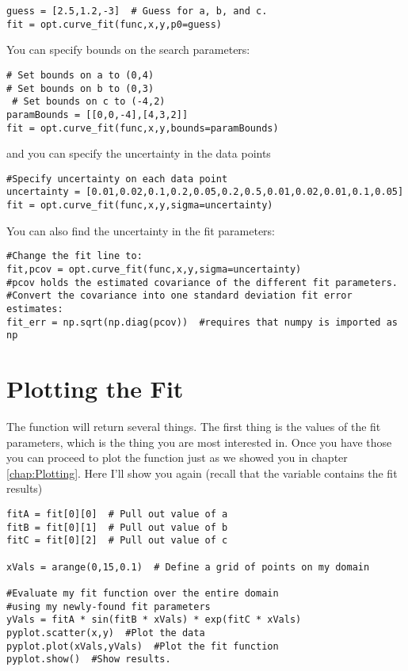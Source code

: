 \begin{Verbatim}
guess = [2.5,1.2,-3]  # Guess for a, b, and c.
fit = opt.curve_fit(func,x,y,p0=guess)
\end{Verbatim}
You can specify bounds on the search parameters:
\begin{Verbatim}
# Set bounds on a to (0,4)
# Set bounds on b to (0,3)
 # Set bounds on c to (-4,2)
paramBounds = [[0,0,-4],[4,3,2]]
fit = opt.curve_fit(func,x,y,bounds=paramBounds)
\end{Verbatim}
and you can specify the uncertainty in the data points
\begin{Verbatim}
#Specify uncertainty on each data point
uncertainty = [0.01,0.02,0.1,0.2,0.05,0.2,0.5,0.01,0.02,0.01,0.1,0.05]
fit = opt.curve_fit(func,x,y,sigma=uncertainty)
\end{Verbatim}

You can also find the uncertainty in the fit parameters:
\begin{Verbatim}
#Change the fit line to:
fit,pcov = opt.curve_fit(func,x,y,sigma=uncertainty)
#pcov holds the estimated covariance of the different fit parameters.
#Convert the covariance into one standard deviation fit error estimates:
fit_err = np.sqrt(np.diag(pcov))  #requires that numpy is imported as np
\end{Verbatim}

\section{Plotting the Fit}
The function  will return several things.  The
first thing is the values of the fit parameters, which is the thing
you are most interested in.  Once you have those you can proceed to
plot the function just as we showed you in chapter \ref{chap:Plotting}.
Here I'll show you again (recall that the variable 
contains the fit results)
\begin{Verbatim}
fitA = fit[0][0]  # Pull out value of a
fitB = fit[0][1]  # Pull out value of b
fitC = fit[0][2]  # Pull out value of c

xVals = arange(0,15,0.1)  # Define a grid of points on my domain

#Evaluate my fit function over the entire domain
#using my newly-found fit parameters
yVals = fitA * sin(fitB * xVals) * exp(fitC * xVals)
pyplot.scatter(x,y)  #Plot the data
pyplot.plot(xVals,yVals)  #Plot the fit function
pyplot.show()  #Show results.
\end{Verbatim}
